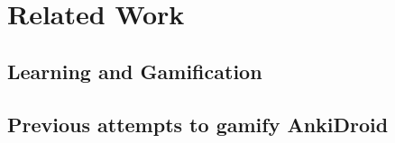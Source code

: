 
\chapter{Related Work} %

\label{rela} %


\section{Learning and Gamification}

\section{Previous attempts to gamify AnkiDroid}
